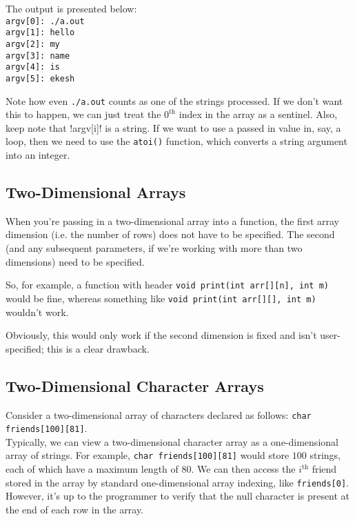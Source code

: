 The output is presented below: \\


{\noindent \texttt{argv[0]: ./a.out\\
argv[1]: hello\\
argv[2]: my\\
argv[3]: name\\
argv[4]: is\\
argv[5]: ekesh \\
}}

Note how even \texttt{./a.out} counts as one of the strings processed. If we don't want this to happen, we can just treat the $0^{\text{th}}$ index in the array as a sentinel. Also, keep note that \text!argv[i]! is a string. If we want to use a passed in value in, say, a loop, then we need to use the \verb!atoi()! function, which converts a string argument into an integer.


\subsection{Two-Dimensional Arrays}

When you're passing in a two-dimensional array into a function, the first array dimension (i.e. the number of rows) does not have to be specified. The second (and any subsequent parameters, if we're working with more than two dimensions) need to be specified.  


So, for example, a function with header \texttt{void print(int arr[][n], int m)} would be fine, whereas something like \texttt{void print(int arr[][], int m)} wouldn't work.

Obviously, this would only work if the second dimension is fixed and isn't user-specified; this is a clear drawback. \\




\subsection{Two-Dimensional Character Arrays}
Consider a two-dimensional array of characters declared as follows: \verb!char friends[100][81]!. \\

Typically, we can view a two-dimensional character array as a one-dimensional array of strings. For example, \verb!char friends[100][81]! would store $100$ strings, each of which have a maximum length of $80$. We can then access the $i^{\text{th}}$ friend stored in the array by standard one-dimensional array indexing, like \verb!friends[0]!. However, it's up to the programmer to verify that the null character is present at the end of each row in the array. \\

